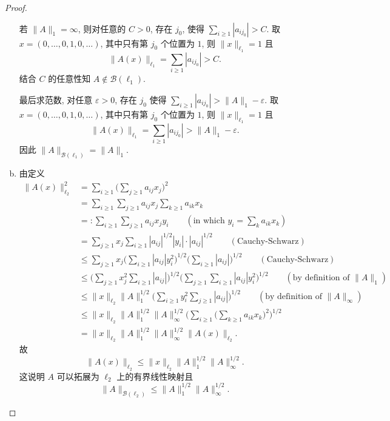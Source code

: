 \begin{proof}
\begin{enumerate}[(a)]
      若 $\|A\|_1=\infty$, 则对任意的 $C>0$, 存在 $j_0$, 使得 $\sum_{i\geq 1} |a_{ij_0}|>C$.
      取 $x = (0,\ldots,0,1,0,\ldots)$, 其中只有第 $j_0$ 个位置为 $1$, 则 $\|x\|_{\ell_1}=1$ 且
      \[ \|A(x)\|_{\ell_1} = \sum_{i\geq 1} |a_{ij_0}| > C. \]
      结合 $C$ 的任意性知 $A\notin \mathcal{B}(\ell_1)$.

      最后求范数, 对任意 $\varepsilon>0$, 存在 $j_0$ 使得 $\sum_{i\geq 1} |a_{ij_0}| > \|A\|_1 - \varepsilon$.
      取 $x = (0,\ldots,0,1,0,\ldots)$, 其中只有第 $j_0$ 个位置为 $1$, 则 $\|x\|_{\ell_1}=1$ 且
      \[ \|A(x)\|_{\ell_1} = \sum_{i\geq 1} |a_{ij_0}| > \|A\|_{1} - \varepsilon. \]
      因此 $\|A\|_{\mathcal{B}(\ell_1)} = \|A\|_1$.
    \item %
      由定义
      \begin{align*}
        \|A(x)\|_{\ell_2}^2
        & = \sum_{i\geq 1} \biggl(\sum_{j\geq 1} a_{ij} x_j\biggr)^2 \\
        & = \sum_{i\geq 1} \sum_{j\geq 1} a_{ij} x_j \sum_{k\geq 1} a_{ik} x_k \\
        & =: \sum_{i\geq 1} \sum_{j\geq 1} a_{ij} x_j y_i 
              \qquad (\text{in which } y_i = \sum_k a_{ik} x_k) \\
        & = \sum_{j\geq 1} x_j \sum_{i\geq 1} |a_{ij}|^{1/2} |y_i| \cdot |a_{ij}|^{1/2} \qquad (\text{Cauchy-Schwarz}) \\
        & \leq \sum_{j\geq 1} x_j \biggl(\sum_{i\geq 1} |a_{ij}| y_i^2\biggr)^{1/2}
            \biggl(\sum_{i\geq 1} |a_{ij}|\biggr)^{1/2} \qquad (\text{Cauchy-Schwarz}) \\
        & \leq \biggl(\sum_{j\geq 1} x_j^2 \sum_{i\geq 1} |a_{ij}|\biggr)^{1/2}
            \biggl(\sum_{j\geq 1} \sum_{i\geq 1} |a_{ij}| y_i^2\biggr)^{1/2} \qquad (\text{by definition of }\|A\|_1)\\
        & \leq \|x\|_{\ell_2} \|A\|_1^{1/2} \biggl(\sum_{i\geq 1} y_i^2 \sum_{j\geq 1} |a_{ij}|\biggr)^{1/2} 
            \qquad (\text{by definition of }\|A\|_\infty) \\
        & \leq \|x\|_{\ell_2} \|A\|_1^{1/2} \|A\|_\infty^{1/2}
            \biggl(\sum_{i\geq 1} \biggl(\sum_{k\geq 1} a_{ik}x_k\biggr)^2\biggr)^{1/2} \\
        & = \|x\|_{\ell_2} \|A\|_1^{1/2} \|A\|_\infty^{1/2} \|A(x)\|_{\ell_2}.
      \end{align*}
      故
      \[ \|A(x)\|_{\ell_2} \leq \|x\|_{\ell_2} \|A\|_1^{1/2} \|A\|_\infty^{1/2}. \]
      这说明 $A$ 可以拓展为 $\ell_2$ 上的有界线性映射且
      \[ \|A\|_{\mathcal{B}(\ell_2)} \leq \|A\|_1^{1/2} \|A\|_\infty^{1/2}. \]

\end{enumerate}
\end{proof}
